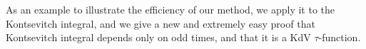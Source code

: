 \documentclass[12pt]{article}
\begin{document}
As an example to illustrate the efficiency of our method, we apply it to the Kontsevitch integral, and we give a new and extremely easy proof that Kontsevitch integral depends only on odd times, and that it is a KdV $\tau$-function.





\vspace{26pt}
\pagestyle{plain}
\setcounter{page}{1}


\newpage

\tableofcontents















\vfill\eject
\end{document}
